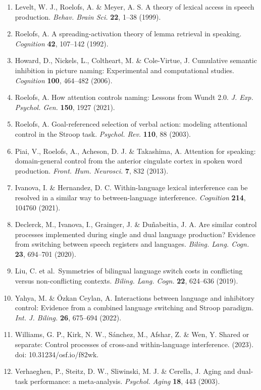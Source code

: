 \documentclass[
]{article}
\begin{document}
\begin{enumerate}
\item
  Levelt, W. J., Roelofs, A. \& Meyer, A. S. A theory of lexical access in speech production. \emph{Behav. Brain Sci.} \textbf{22}, 1--38 (1999).
\item
  Roelofs, A. A spreading-activation theory of lemma retrieval in speaking. \emph{Cognition} \textbf{42}, 107--142 (1992).
\item
  Howard, D., Nickels, L., Coltheart, M. \& Cole-Virtue, J. Cumulative semantic inhibition in picture naming: Experimental and computational studies. \emph{Cognition} \textbf{100}, 464--482 (2006).
\item
  Roelofs, A. How attention controls naming: Lessons from Wundt 2.0. \emph{J. Exp. Psychol. Gen.} \textbf{150}, 1927 (2021).
\item
  Roelofs, A. Goal-referenced selection of verbal action: modeling attentional control in the Stroop task. \emph{Psychol. Rev.} \textbf{110}, 88 (2003).
\item
  Piai, V., Roelofs, A., Acheson, D. J. \& Takashima, A. Attention for speaking: domain-general control from the anterior cingulate cortex in spoken word production. \emph{Front. Hum. Neurosci.} \textbf{7}, 832 (2013).
\item
  Ivanova, I. \& Hernandez, D. C. Within-language lexical interference can be resolved in a similar way to between-language interference. \emph{Cognition} \textbf{214}, 104760 (2021).
\item
  Declerck, M., Ivanova, I., Grainger, J. \& Duñabeitia, J. A. Are similar control processes implemented during single and dual language production? Evidence from switching between speech registers and languages. \emph{Biling. Lang. Cogn.} \textbf{23}, 694--701 (2020).
\item
  Liu, C. et al.~Symmetries of bilingual language switch costs in conflicting versus non-conflicting contexts. \emph{Biling. Lang. Cogn.} \textbf{22}, 624--636 (2019).
\item
  Yahya, M. \& Özkan Ceylan, A. Interactions between language and inhibitory control: Evidence from a combined language switching and Stroop paradigm. \emph{Int. J. Biling.} \textbf{26}, 675--694 (2022).
\item
  Williams, G. P., Kirk, N. W., Sánchez, M., Afshar, Z. \& Wen, Y. Shared or separate: Control processes of cross-and within-language interference. (2023). doi: 10.31234/osf.io/f82wk.
\item
  Verhaeghen, P., Steitz, D. W., Sliwinski, M. J. \& Cerella, J. Aging and dual-task performance: a meta-analysis. \emph{Psychol. Aging} \textbf{18}, 443 (2003).

\end{enumerate}
\end{document}
